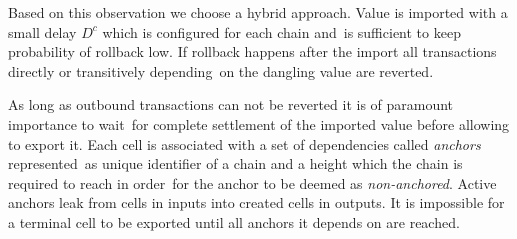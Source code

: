 Based on this observation we choose a hybrid approach.
Value is imported with a small delay $D^c$ which is configured for each chain and\
is sufficient to keep probability of rollback low.
If rollback happens after the import all transactions directly or transitively depending\
on the dangling value are reverted.

As long as outbound transactions can not be reverted it is of paramount importance to wait\
for complete settlement of the imported value before allowing to export it.
Each cell is associated with a set of dependencies called \emph{anchors} represented\
as unique identifier of a chain and a height which the chain is required to reach in order\
for the anchor to be deemed as \emph{non-anchored}.
Active anchors leak from cells in inputs into created cells in outputs.
It is impossible for a terminal cell to be exported until all anchors it depends on are reached.